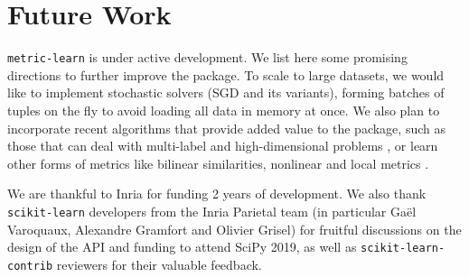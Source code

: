 \documentclass[twoside,11pt]{article}
\newcommand{\aurelien}[1]{\todo[inline,caption={},color=orange!40]{{\it Aurelien:~}#1}}
\newcommand{\william}[1]{\todo[inline,caption={},color=blue!40]{{\it William:~}#1}}
\begin{document}



\section{Future Work}

\texttt{metric-learn} is under active development. We list here some promising directions to further improve the package. To scale to large datasets, we would like to implement stochastic solvers (SGD and its variants), forming batches of tuples on the fly to avoid loading all data in memory at once. %
We also plan to incorporate recent algorithms that provide added value to the package, such as those that can deal with multi-label \citep{liu15} and high-dimensional problems \citep{Liu19}, or learn other forms of metrics like bilinear similarities, nonlinear and local metrics \citep[see][for a survey]{Bellet15}.

\acks

We are thankful to Inria for funding 2 years of development. We also thank \texttt{scikit-learn} developers from the Inria Parietal team (in particular Gaël Varoquaux, Alexandre Gramfort and Olivier Grisel) for fruitful discussions on the design of the API and funding to attend SciPy 2019, as well as \texttt{scikit-learn-contrib} reviewers for their valuable feedback.





\end{document}

